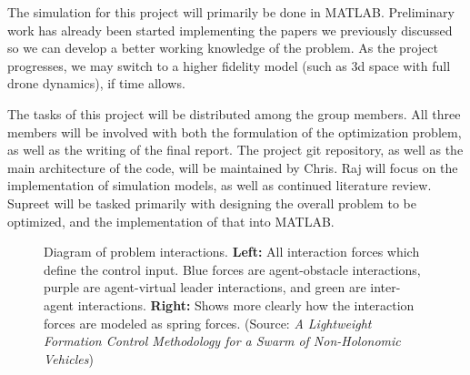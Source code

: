 \documentclass[11pt]{article}
\begin{document}
The simulation for this project will primarily be done in MATLAB.  Preliminary work has already been started implementing the papers we previously discussed so we can develop a better working knowledge of the problem.  As the project progresses, we may switch to a higher fidelity model (such as 3d space with full drone dynamics), if time allows.

The tasks of this project will be distributed among the group members.  All three members will be involved with both the formulation of the optimization problem, as well as the writing of the final report.  The project git repository, as well as the main architecture of the code, will be maintained by Chris.  Raj will focus on the implementation of simulation models, as well as continued literature review.  Supreet will be tasked primarily with designing the overall problem to be optimized, and the implementation of that into MATLAB.

\begin{figure}[H]
  \caption{Diagram of problem interactions.  \textbf{Left:} All interaction forces which define the control input.  Blue forces are agent-obstacle interactions, purple are agent-virtual leader interactions, and green are inter-agent interactions.  \textbf{Right:} Shows more clearly how the interaction forces are modeled as spring forces.  (Source: \textit{A Lightweight Formation Control Methodology for a Swarm of Non-Holonomic Vehicles})}
  \label{fig:key}
\end{figure}
\end{document}
